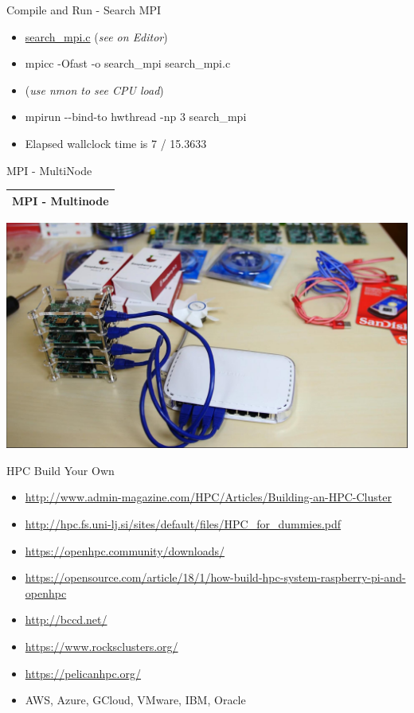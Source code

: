 \documentclass[ignorenonframetext,]{beamer}
\providecommand{\tightlist}{%
  \setlength{\itemsep}{0pt}\setlength{\parskip}{0pt}}
\begin{document}
\begin{frame}{Compile and Run - Search MPI}

\begin{itemize}
\tightlist
\item
  \url{search_mpi.c} (\emph{see on Editor})
\item
  mpicc -Ofast -o search\_mpi search\_mpi.c
\item
  (\emph{use nmon to see CPU load})
\item
  mpirun -\/-bind-to hwthread -np 3 search\_mpi
\end{itemize}


\begin{itemize}
\tightlist
\item
  Elapsed wallclock time is 7 / 15.3633
\end{itemize}


\end{frame}

\begin{frame}{MPI - MultiNode}

\begin{longtable}[]{@{}l@{}}
\toprule
\endhead
MPI - Multinode\tabularnewline
\bottomrule
\end{longtable}

\includegraphics{images/PI-Cluster.jpg}

\end{frame}

\begin{frame}{HPC Build Your Own}

\begin{itemize}
\tightlist
\item
  \url{http://www.admin-magazine.com/HPC/Articles/Building-an-HPC-Cluster}
\item
  \url{http://hpc.fs.uni-lj.si/sites/default/files/HPC_for_dummies.pdf}
\item
  \url{https://openhpc.community/downloads/}
\item
  \url{https://opensource.com/article/18/1/how-build-hpc-system-raspberry-pi-and-openhpc}
\item
  \url{http://bccd.net/}
\item
  \url{https://www.rocksclusters.org/}
\item
  \url{https://pelicanhpc.org/}
\item
  AWS, Azure, GCloud, VMware, IBM, Oracle
\end{itemize}


\end{frame}
\end{document}
